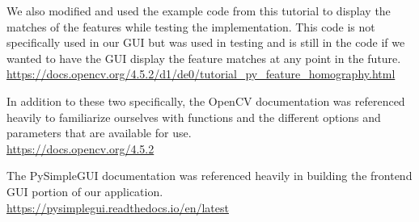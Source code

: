 \documentclass[12pt]{article}
\begin{document}
	
	We also modified and used the example code from this tutorial to display the matches of the features while testing the implementation. This code is not specifically used in our GUI but was used in testing and is still in the code if we wanted to have the GUI display the feature matches at any point in the future. \\
	\url{https://docs.opencv.org/4.5.2/d1/de0/tutorial_py_feature_homography.html}
	
	In addition to these two specifically, the OpenCV documentation was referenced heavily to familiarize ourselves with functions and the different options and parameters that are available for use. \\
	\url{https://docs.opencv.org/4.5.2}
	
	The PySimpleGUI documentation was referenced heavily in building the frontend GUI portion of our application. \\ \url{https://pysimplegui.readthedocs.io/en/latest}
\end{document}
